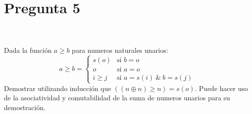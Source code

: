 \documentclass{article}
\begin{document}
\section{Pregunta 5}
\\
\\
Dada la funci\'on $a\geq b$ para numeros naturales unarios:
\[
        a\geq b =
                \left\{
                        \begin{array}{ll}
                                s(o)  & \mbox{si } b = o \\
                                o & \mbox{si } a = o \\
                                i\geq j & \mbox{si } a = s(i)\ \&\ b = s(j)
                        \end{array}
                \right.
\]
Demostrar utilizando inducci\'on que $((n\oplus n)\geq n) = s(o)$. Puede
hacer uso de la asociatividad y comutabilidad de la suma de numeros
unarios para su demostraci\'on.
\\
\\
\end{document}
